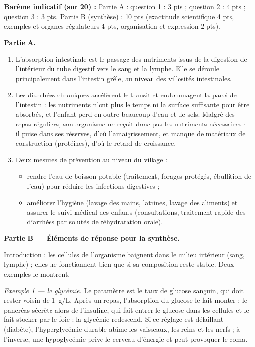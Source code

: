 \documentclass[11pt]{article}
\newcommand{\cle}[1]{{\popxbold\color{popdark}#1}}
\begin{document}
\begin{corrige}
\textbf{Barème indicatif (sur 20) :} Partie A : question 1 : 3 pts ; question 2 : 4 pts ; question 3 : 3 pts. Partie B (synthèse) : 10 pts (exactitude scientifique 4 pts, exemples et organes régulateurs 4 pts, organisation et expression 2 pts).

\textbf{Partie A.}
\begin{enumerate}
\item L'absorption intestinale est le passage des nutriments issus de la digestion de l'intérieur du tube digestif vers le sang et la lymphe. Elle se déroule principalement dans l'\cle{intestin grêle}, au niveau des villosités intestinales.
\item Les diarrhées chroniques accélèrent le transit et endommagent la paroi de l'intestin : les nutriments n'ont plus le temps ni la surface suffisante pour être absorbés, et l'enfant perd en outre beaucoup d'eau et de sels. Malgré des repas réguliers, son organisme ne reçoit donc pas les nutriments nécessaires : il puise dans ses réserves, d'où l'amaigrissement, et manque de matériaux de construction (protéines), d'où le retard de croissance.
\item Deux mesures de prévention au niveau du village :
\begin{itemize}
\item rendre l'eau de boisson potable (traitement, forages protégés, ébullition de l'eau) pour réduire les infections digestives ;
\item améliorer l'hygiène (lavage des mains, latrines, lavage des aliments) et assurer le suivi médical des enfants (consultations, traitement rapide des diarrhées par solutés de réhydratation orale).
\end{itemize}
\end{enumerate}

\textbf{Partie B — Éléments de réponse pour la synthèse.}

Introduction : les cellules de l'organisme baignent dans le milieu intérieur (sang, lymphe) ; elles ne fonctionnent bien que si sa composition reste stable. Deux exemples le montrent.

\emph{Exemple 1 — la glycémie.} Le paramètre est le taux de glucose sanguin, qui doit rester voisin de \SI{1}{g/L}. Après un repas, l'absorption du glucose le fait monter ; le \cle{pancréas} sécrète alors de l'\cle{insuline}, qui fait entrer le glucose dans les cellules et le fait stocker par le \cle{foie} : la glycémie redescend. Si ce réglage est défaillant (diabète), l'hyperglycémie durable abîme les vaisseaux, les reins et les nerfs ; à l'inverse, une hypoglycémie prive le cerveau d'énergie et peut provoquer le coma.


\end{corrige}
\end{document}
